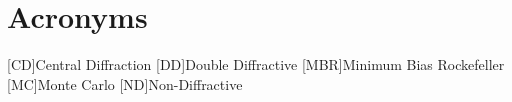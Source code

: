 \chapter{Acronyms}\label{chapter:acronyms}

\begin{acronym}[BRAHMS]
	[CD]{Central Diffraction}
	[DD]{Double Diffractive}
	[MBR]{Minimum Bias Rockefeller}
	[MC]{Monte Carlo}
	[ND]{Non-Diffractive}

\end{acronym}

